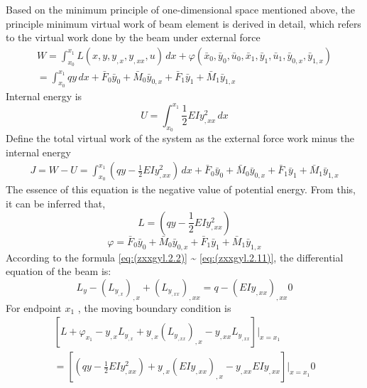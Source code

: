 Based on the minimum principle of one-dimensional space mentioned above, the principle minimum virtual work of beam element is derived in detail, which refers to the virtual work done by the beam under external force
\begin{multline} \label{eq:(zxxgyl.2.14)}    
W= \int_{x_{0}}^{x_{1}} L(x,y,y_{,x},y_{,xx},u)\,dx+\varphi(\bar {x}_ {0},\bar {y}_ {0},\bar {u}_ {0},\bar {x}_ {1},\bar {y}_ {1},\bar {u}_ {1},\bar {y}_ {0,x},\bar {y}_ {1,x})
\\
=\int_{x_{0}}^{x_{1}} qy\,dx+\bar {F}_0 \bar {y}_ {0}+\bar {M}_0 \bar {y}_ {0,x}+\bar {F}_1 \bar {y}_ {1}+\bar {M}_1 \bar {y}_ {1,x}
\end{multline}
Internal energy is
\begin{equation} \label{eq:(zxxgyl.2.15)}    
U=\int_{x_{0}}^{x_{1}} \frac{1} {2}EIy_ {,xx}^2\,dx
\end{equation}
Define the total virtual work of the system as the external force work minus the internal energy
\begin{multline} \label{eq:(zxxgyl.2.16)}    
J= W-U=\int_{x_{0}}^{x_{1}} (qy-\frac{1} {2}EIy_ {,xx}^2)\,dx+\bar {F}_0 \bar {y}_ {0}+\bar {M}_0 \bar {y}_ {0,x}+\bar {F}_1 \bar {y}_ {1}+\bar {M}_1 \bar {y}_ {1,x}
\end{multline}
The essence of this equation is the negative value of potential energy.
From this, it can be inferred that,
\begin{equation} \label{eq:(zxxgyl.2.17)}    
L =(qy-\frac{1} {2}EIy_ {,xx}^2)
\end{equation}
\begin{equation} \label{eq:(zxxgyl.2.18)}    
\varphi=\bar {F}_0 \bar {y}_ {0}+\bar {M}_0 \bar {y}_ {0,x}+\bar {F}_1 \bar {y}_ {1}+\bar {M}_1 \bar {y}_ {1,x}
\end{equation}
According to the formula \ref{eq:(zxxgyl.2.2)} \~{} \ref{eq:(zxxgyl.2.11)}, the differential equation of the beam is:
\begin{equation} \label{eq:(zxxgyl.2.19)}    
L_{y} - 
\left(L_{y_{,x}}\right)_{,x}+\left(L_{y_{,xx}}\right)_{,xx}
=q-(EIy_{,xx})_{,xx}
0
\end{equation}
For endpoint $ x_ {1}$  , the moving boundary condition is
\begin{multline} \label{eq:(zxxgyl.2.18)}    
[L+ \varphi_{x_{1}}
-y_{,x} L_{y_{,x}}   + y_{,x} \left(L_{y_{,xx}}\right)_{,x} 
-y_{,xx} L_{y_{,xx}} 
]|_{x=x_1}
\\=[(qy-\frac{1} {2}EIy_ {,xx}^2)+y_{,x} \left(EIy_{,xx}\right)_{,x} 
-y_{,xx} EIy_{,xx}]|_{x=x_1}  
0
\end{multline}
